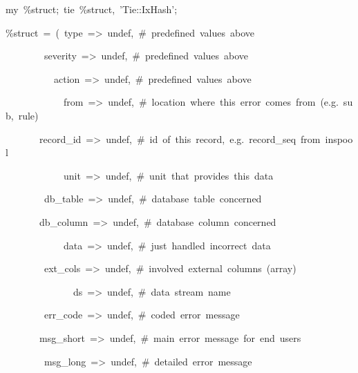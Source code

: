 \begin{table}[htbp]
\begin{lyxcode}
{\footnotesize my~\%struct;~tie~\%struct,~'Tie::IxHash';}{\footnotesize \par}

{\footnotesize \%struct~=~(~type~=>~undef,~\#~predefined~values~above~}{\footnotesize \par}

~{\footnotesize ~~~~~~~severity~=>~undef,~\#~predefined~values~above~}{\footnotesize \par}

~{\footnotesize ~~~~~~~~~action~=>~undef,~\#~predefined~values~above}{\footnotesize \par}

~{\footnotesize ~~~~~~~~~~~from~=>~undef,~\#~location~where~this~error~comes~from~(e.g.~sub,~rule)~}{\footnotesize \par}

~{\footnotesize ~~~~~~record\_id~=>~undef,~\#~id~of~this~record,~e.g.~record\_seq~from~inspool}{\footnotesize \par}

~{\footnotesize ~~~~~~~~~~~unit~=>~undef,~\#~unit~that~provides~this~data}{\footnotesize \par}

~{\footnotesize ~~~~~~~db\_table~=>~undef,~\#~database~table~concerned}{\footnotesize \par}

~{\footnotesize ~~~~~~db\_column~=>~undef,~\#~database~column~concerned}{\footnotesize \par}

~{\footnotesize ~~~~~~~~~~~data~=>~undef,~\#~just~handled~incorrect~data}{\footnotesize \par}

~{\footnotesize ~~~~~~~ext\_cols~=>~undef,~\#~involved~external~columns~(array)}{\footnotesize \par}

~{\footnotesize ~~~~~~~~~~~~~ds~=>~undef,~\#~data~stream~name}{\footnotesize \par}

~{\footnotesize ~~~~~~~err\_code~=>~undef,~\#~coded~error~message}{\footnotesize \par}

~{\footnotesize ~~~~~~msg\_short~=>~undef,~\#~main~error~message~for~end~users}{\footnotesize \par}

~{\footnotesize ~~~~~~~msg\_long~=>~undef,~\#~detailed~error~message}{\footnotesize \par}


\end{lyxcode}
\end{table}
